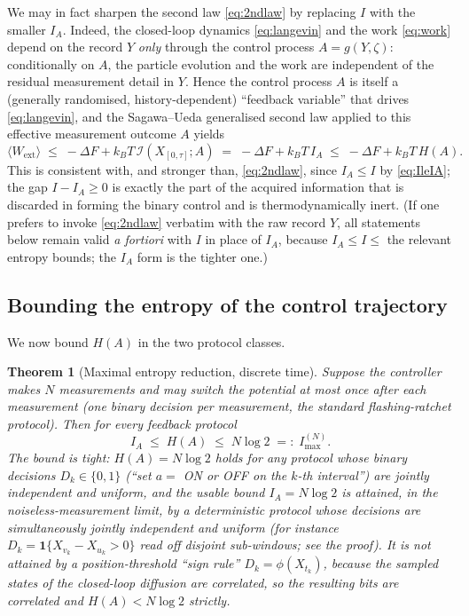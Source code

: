 \documentclass{amsart}
\newtheorem{theorem}{Theorem}
\theoremstyle{definition}
\newcommand{\kB}{k_{B}}
\newcommand{\Wext}{\langle W_{\mathrm{ext}}\rangle}
\begin{document}
We may in fact sharpen the second law \eqref{eq:2ndlaw} by replacing $I$ with
the smaller $I_A$. Indeed, the closed-loop dynamics \eqref{eq:langevin} and the
work \eqref{eq:work} depend on the record $Y$ \emph{only} through the control
process $A=g(Y,\zeta)$: conditionally on $A$, the particle evolution and the
work are independent of the residual measurement detail in $Y$. Hence the
control process $A$ is itself a (generally randomised, history-dependent)
``feedback variable'' that drives \eqref{eq:langevin}, and the
Sagawa--Ueda generalised second law applied to this effective measurement
outcome $A$ yields
\begin{equation}\label{eq:2ndlaw2}
\Wext \;\le\; -\Delta F + \kB T\, \mathcal I(X_{[0,\tau]};A)
\;=\;-\Delta F + \kB T\, I_A \;\le\; -\Delta F + \kB T\, H(A).
\end{equation}
This is consistent with, and stronger than, \eqref{eq:2ndlaw}, since
$I_A\le I$ by \eqref{eq:IleIA}; the gap $I-I_A\ge0$ is exactly the part of the
acquired information that is discarded in forming the binary control and is
thermodynamically inert. (If one prefers to invoke \eqref{eq:2ndlaw} verbatim
with the raw record $Y$, all statements below remain valid \emph{a fortiori}
with $I$ in place of $I_A$, because $I_A\le I\le$ the relevant entropy bounds;
the $I_A$ form is the tighter one.)

\subsection{Bounding the entropy of the control trajectory}

We now bound $H(A)$ in the two protocol classes.

\begin{theorem}[Maximal entropy reduction, discrete time]\label{thm:Imax-discrete}
Suppose the controller makes $N$ measurements and may switch the potential at
most once after each measurement (one binary decision per measurement, the
standard flashing-ratchet protocol). Then for every feedback protocol
\begin{equation}\label{eq:Imax-discrete}
I_A \;\le\; H(A) \;\le\; N\log 2 \;=:\; I_{\max}^{(N)} .
\end{equation}
The bound is tight: $H(A)=N\log 2$ holds for any protocol whose binary
decisions $D_k\in\{0,1\}$ (``set $a=$ ON or OFF on the $k$-th interval'') are
\emph{jointly independent} and uniform, and the \emph{usable} bound
$I_A=N\log2$ is attained, in the noiseless-measurement limit, by a deterministic
protocol whose decisions are simultaneously jointly independent and uniform
(for instance $D_k=\mathbf 1\{X_{v_k}-X_{u_k}>0\}$ read off disjoint
sub-windows; see the proof). It is \emph{not} attained by a position-threshold
``sign rule'' $D_k=\phi(X_{t_k})$, because the sampled states of the closed-loop
diffusion are correlated, so the resulting bits are correlated and
$H(A)<N\log2$ strictly.
\end{theorem}
\end{document}
